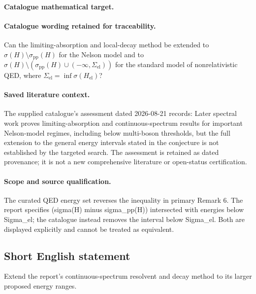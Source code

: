 \documentclass[11pt]{article}
\begin{document}
\paragraph{Catalogue mathematical target.}
\paragraph{Catalogue wording retained for traceability.}
Can the limiting-absorption and local-decay method be extended to $\sigma(H)\setminus\sigma_{\mathrm{pp}}(H)$ for the Nelson model and to $\sigma(H)\setminus(\sigma_{\mathrm{pp}}(H)\cup(-\infty,\Sigma_{\mathrm{el}}))$ for the standard model of nonrelativistic QED, where $\Sigma_{\mathrm{el}}=\inf\sigma(H_{\mathrm{el}})$?

\paragraph{Saved literature context.} The supplied catalogue's assessment dated 2026-08-21 records: Later spectral work proves limiting-absorption and continuous-spectrum results for important Nelson-model regimes, including below multi-boson thresholds, but the full extension to the general energy intervals stated in the conjecture is not established by the targeted search. The assessment is retained as dated provenance; it is not a new comprehensive literature or open-status certification.
\paragraph{Scope and source qualification.}The curated QED energy set reverses the inequality in primary Remark 6. The report specifies (sigma(H) minus sigma_pp(H)) intersected with energies below Sigma_el; the catalogue instead removes the interval below Sigma_el. Both are displayed explicitly and cannot be treated as equivalent.
\subsection{Short English statement}
Extend the report's continuous-spectrum resolvent and decay method to its larger proposed energy ranges.
\end{document}
